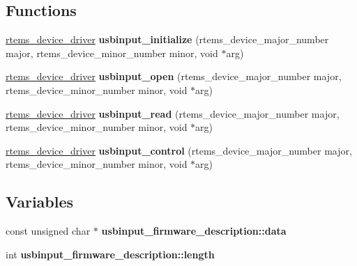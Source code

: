 \subsection*{Functions}
\begin{DoxyCompactItemize}
\item 
\mbox{\label{group__lm32__milkymist__usbinput_ga644298d529d380df261bf3ad34289e15}} 
\mbox{\hyperlink{group__ClassicStatus_ga545d41846817eaba6143d52ee4d9e9fe}{rtems\+\_\+device\+\_\+driver}} {\bfseries usbinput\+\_\+initialize} (rtems\+\_\+device\+\_\+major\+\_\+number major, rtems\+\_\+device\+\_\+minor\+\_\+number minor, void $\ast$arg)
\item 
\mbox{\label{group__lm32__milkymist__usbinput_gac6580de0e3c50fa7f78fc48ec49d5d58}} 
\mbox{\hyperlink{group__ClassicStatus_ga545d41846817eaba6143d52ee4d9e9fe}{rtems\+\_\+device\+\_\+driver}} {\bfseries usbinput\+\_\+open} (rtems\+\_\+device\+\_\+major\+\_\+number major, rtems\+\_\+device\+\_\+minor\+\_\+number minor, void $\ast$arg)
\item 
\mbox{\label{group__lm32__milkymist__usbinput_gab5c06e589b45b4c328fc27c963b27085}} 
\mbox{\hyperlink{group__ClassicStatus_ga545d41846817eaba6143d52ee4d9e9fe}{rtems\+\_\+device\+\_\+driver}} {\bfseries usbinput\+\_\+read} (rtems\+\_\+device\+\_\+major\+\_\+number major, rtems\+\_\+device\+\_\+minor\+\_\+number minor, void $\ast$arg)
\item 
\mbox{\label{group__lm32__milkymist__usbinput_gaf73ac35df27a9ab6decd2389776f35e0}} 
\mbox{\hyperlink{group__ClassicStatus_ga545d41846817eaba6143d52ee4d9e9fe}{rtems\+\_\+device\+\_\+driver}} {\bfseries usbinput\+\_\+control} (rtems\+\_\+device\+\_\+major\+\_\+number major, rtems\+\_\+device\+\_\+minor\+\_\+number minor, void $\ast$arg)
\end{DoxyCompactItemize}
\subsection*{Variables}
\begin{DoxyCompactItemize}
\item 
\mbox{\label{group__lm32__milkymist__usbinput_ga62740254776b1642687c278f1707e23b}} 
const unsigned char $\ast$ {\bfseries usbinput\+\_\+firmware\+\_\+description\+::data}
\item 
\mbox{\label{group__lm32__milkymist__usbinput_ga9c00a158673452f49b191ebfe64e4130}} 
int {\bfseries usbinput\+\_\+firmware\+\_\+description\+::length}
\end{DoxyCompactItemize}


